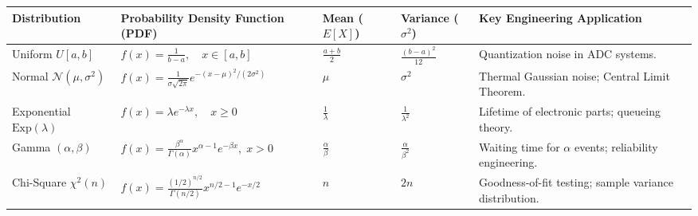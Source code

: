 \documentclass[12pt,a4paper]{article}
\renewcommand{\arraystretch}{1.45}
\begin{document}
\vspace{2pt}

\begin{tcolorbox}[tikzbox, title={\textbf{Summary Matrix: Comprehensive Comparison of Continuous Distributions}}]
\par\vspace{1pt}
\begingroup
\setlength{\tabcolsep}{3.5pt}
\setlength{\extrarowheight}{1.0pt}
\renewcommand{\arraystretch}{1.12}
\noindent\begin{tabularx}{\linewidth}{|B{2.5cm}|B{3.8cm}|B{2.2cm}|B{2.2cm}|Y|}
\hline
\textbf{Distribution} & \textbf{Probability Density Function (PDF)} & \textbf{Mean ($E[X]$)} & \textbf{Variance ($\sigma^2$)} & \textbf{Key Engineering Application} \\
\hline
Uniform $U[a, b]$ & $f(x) = \frac{1}{b-a}, \quad x \in [a, b]$ & $\frac{a+b}{2}$ & $\frac{(b-a)^2}{12}$ & Quantization noise in ADC systems. \\
\hline
Normal $\mathcal{N}(\mu, \sigma^2)$ & $f(x) = \frac{1}{\sigma\sqrt{2\pi}} e^{-(x-\mu)^2/(2\sigma^2)}$ & $\mu$ & $\sigma^2$ & Thermal Gaussian noise; Central Limit Theorem. \\
\hline
Exponential $\text{Exp}(\lambda)$ & $f(x) = \lambda e^{-\lambda x}, \quad x \ge 0$ & $\frac{1}{\lambda}$ & $\frac{1}{\lambda^2}$ & Lifetime of electronic parts; queueing theory. \\
\hline
Gamma $(\alpha, \beta)$ & $f(x) = \frac{\beta^\alpha}{\Gamma(\alpha)} x^{\alpha-1} e^{-\beta x}, \; x > 0$ & $\frac{\alpha}{\beta}$ & $\frac{\alpha}{\beta^2}$ & Waiting time for $\alpha$ events; reliability engineering. \\
\hline
Chi-Square $\chi^2(n)$ & $f(x) = \frac{(1/2)^{n/2}}{\Gamma(n/2)} x^{n/2-1} e^{-x/2}$ & $n$ & $2n$ & Goodness-of-fit testing; sample variance distribution. \\
\hline
\end{tabularx}\par
\endgroup
\end{tcolorbox}
\end{document}
